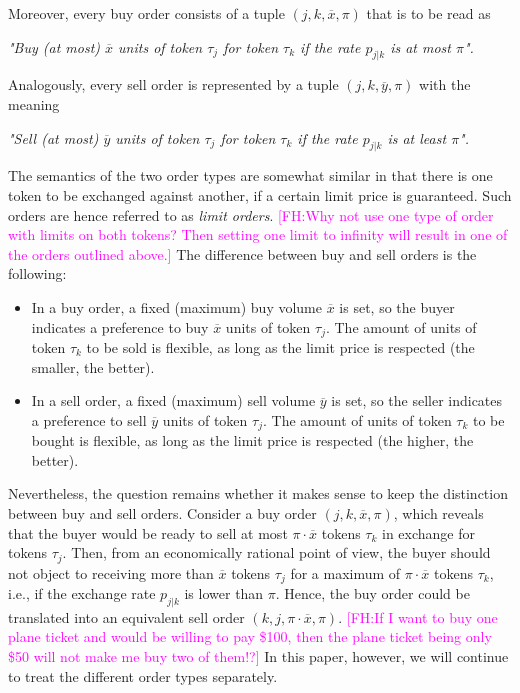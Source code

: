 \documentclass[11pt,parskip=full]{scrartcl}%
\newcommand*{\ie}{i.e., }
\newcommand{\FH}[1]{\textcolor{magenta}{[FH:#1]}}
\begin{document}
Moreover, every buy order consists of a tuple $ (j,k,\overline{x},\pi) $ that is to be read as
\vspace{-.6cm}
\begin{center}
  \emph{
    "Buy (at most) $ \overline{x} $ units of token $ \tau_j $ for token $ \tau_k $
    if the rate $ p_{j|k} $ is at most $ \pi $".
  }
\end{center}
\vspace{-.4cm}
Analogously, every sell order is represented by a tuple $ (j,k,\overline{y},\pi) $ with the meaning
\vspace{-.6cm}
\begin{center}
  \emph{
    "Sell (at most) $ \overline{y} $ units of token $ \tau_j $ for token $ \tau_k $
    if the rate $ p_{j|k} $ is at least $ \pi $".
  }
\end{center}
\vspace{-.3cm}

The semantics of the two order types are somewhat similar in that there is one token to be
exchanged against another, if a certain limit price is guaranteed.
Such orders are hence referred to as \emph{limit orders}.
\FH{Why not use one type of order with limits on both tokens? Then setting one limit to infinity will result in one of the orders outlined above.}
The difference between buy and sell orders is the following:
\begin{itemize}
  \item In a buy order, a fixed (maximum) buy volume $ \overline{x} $ is set, so the buyer
  indicates a preference to buy $ \overline{x} $ units of token $ \tau_j $.
  The amount of units of token $ \tau_k $ to be sold is flexible, as long as the limit price is
  respected (the smaller, the better).
  \item In a sell order, a fixed (maximum) sell volume $ \overline{y} $ is set, so the seller
  indicates a preference to sell $ \overline{y} $ units of token $ \tau_j $.
  The amount of units of token $ \tau_k $ to be bought is flexible, as long as the limit price
  is respected (the higher, the better).
\end{itemize}
\vspace{.3cm}

Nevertheless, the question remains whether it makes sense to keep the distinction between buy and
sell orders.
Consider a buy order $ (j,k,\overline{x},\pi) $, which reveals that the buyer would be ready to
sell at most $ \pi \cdot \overline{x} $ tokens $ \tau_k $ in exchange for tokens $ \tau_j $.
Then, from an economically rational point of view, the buyer should not object to receiving more
than $ \overline{x} $ tokens $ \tau_j $ for a maximum of $ \pi \cdot \overline{x} $ tokens
$ \tau_k $, \ie if the exchange rate $ p_{j|k} $ is lower than $ \pi $.
Hence, the buy order could be translated into an equivalent sell order
$ (k,j,\pi \cdot \overline{x},\pi) $.
\FH{If I want to buy one plane ticket and would be willing to pay \$100, then the plane ticket being only \$50 will not make me buy two of them!?}
In this paper, however, we will continue to treat the different order types separately.
\end{document}

